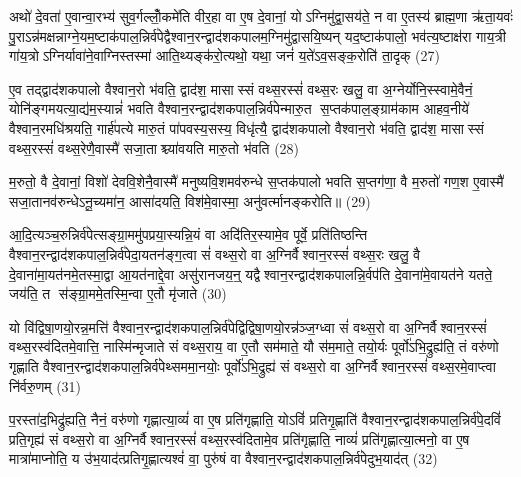 अथो॑ दे॒वता॑ ए॒वान्वा॒रभ्य॑ सुव॒र्गल्लोँ॒कमे॑ति वीर॒हा वा ए॒ष दे॒वानां॒ योऽग्निमु॑द्वा॒सय॑ते॒ न वा ए॒तस्य॑ ब्राह्म॒णा ऋ॑ता॒यवः॑ पु॒राऽन्न॑मक्षन्नाग्ने॒यम॒ष्टाक॑पाल॒न्निर्व॑पेद्वैश्वान॒रन्द्वाद॑शकपालम॒ग्निमु॑द्वासयि॒ष्यन् यद॒ष्टाक॑पालो॒ भव॑त्य॒ष्टाक्ष॑रा गाय॒त्री गा॑य॒त्रोऽग्निर्यावा॑ने॒वाग्निस्तस्मा॑ आति॒थ्यङ्क॑रो॒त्यथो॒ यथा॒ जनं॑ य॒ते॑ऽव॒सङ्क॒रोति॑ ता॒दृक् (27)

ए॒व तद्द्वाद॑शकपालो वैश्वान॒रो भ॑वति॒ द्वाद॑श॒ मासास्सं वथ्स॒रस्सं॑ वथ्स॒रः खलु॒ वा अ॒ग्नेर्योनि॒स्स्वामे॒वैनं॒ योनि॑ङ्गमयत्या॒द्य॑म॒स्यान्नं॑ भवति वैश्वान॒रन्द्वाद॑शकपाल॒न्निर्व॑पेन्मारु॒त स॒प्तक॑पाल॒ङ्ग्राम॑काम आहव॒नीये॑ वैश्वान॒रमधि॑श्रयति॒ गार्\mbox{}ह॑पत्ये मारु॒तं पा॑पवस्य॒सस्य॒ विधृ॑त्यै॒ द्वाद॑शकपालो वैश्वान॒रो भ॑वति॒ द्वाद॑श॒ मासास्सं वथ्स॒रस्सं॑ वथ्स॒रेणै॒वास्मै॑ सजा॒ताश्च्या॑वयति मारु॒तो भ॑वति (28)

म॒रुतो॒ वै दे॒वानां॒ विशो॑ देववि॒शेनै॒वास्मै॑ मनुष्यवि॒शमव॑रुन्धे स॒प्तक॑पालो भवति स॒प्तग॑णा॒ वै म॒रुतो॑ गण॒श ए॒वास्मै॑ सजा॒तानव॑रुन्धेऽनू॒च्यमा॑न॒ आसा॑दयति॒ विश॑मे॒वास्मा॒ अनु॑वर्त्मानङ्करोति॥ (29)

{\anuvakamend[{प्र॒जाका॑मस्सं वथ्स॒रः पु॒नात्ये॒वैनं॑ पू॒तस्सम॑ष्ट्यै ता॒दृङ्मा॑रु॒तो भ॑व॒त्येका॒न्नत्रि॒ꣳ॒शच्च॑॥५॥}]}

आ॒दि॒त्यञ्च॒रुन्निर्व॑पेत्सङ्ग्रा॒ममु॑पप्रया॒स्यन्नि॒यं वा अदि॑तिर॒स्यामे॒व पूर्वे॒ प्रति॑तिष्ठन्ति वैश्वान॒रन्द्वाद॑शकपाल॒न्निर्व॑पेदा॒यतन॑ङ्ग॒त्वा सं॑ वथ्स॒रो वा अ॒ग्निर्वैश्वान॒रस्सं॑ वथ्स॒रः खलु॒ वै दे॒वाना॑मा॒यत॑नमे॒तस्मा॒द्वा आ॒यत॑नाद्दे॒वा असु॑रानजय॒न्॒ यद्वैश्वान॒रन्द्वाद॑शकपालन्नि॒र्वप॑ति दे॒वाना॑मे॒वायत॑ने यतते॒ जय॑ति॒ त स॑ङ्ग्रा॒ममे॒तस्मि॒न्वा ए॒तौ मृ॑जाते (30)

यो वि॑द्विषा॒णयो॒रन्न॒मत्ति॑ वैश्वान॒रन्द्वाद॑शकपाल॒न्निर्व॑पेद्विद्विषा॒णयो॒रन्न॑ञ्ज॒ग्ध्वा सं॑ वथ्स॒रो वा अ॒ग्निर्वैश्वान॒रस्सं॑ वथ्स॒रस्व॑दितमे॒वात्ति॒ नास्मि॑न्मृजाते सं वथ्स॒राय॒ वा ए॒तौ सम॑माते॒ यौ स॑म॒माते॒ तयो॒र्यः पूर्वो॑ऽभि॒द्रुह्य॑ति॒ तं वरु॑णो गृह्णाति वैश्वान॒रन्द्वाद॑शकपाल॒न्निर्व॑पेथ्सममा॒नयोः॒ पूर्वो॑ऽभि॒द्रुह्य॑ सं वथ्स॒रो वा अ॒ग्निर्वैश्वान॒रस्सं॑ वथ्स॒रमे॒वाप्त्वा नि॑र्वरु॒णम् (31)

प॒रस्ता॑द॒भिद्रु॑ह्यति॒ नैनं॒ वरु॑णो गृह्णात्या॒व्यं॑ वा ए॒ष प्रति॑गृह्णाति॒ योऽविं॑ प्रतिगृ॒ह्णाति॑ वैश्वान॒रन्द्वाद॑शकपाल॒न्निर्व॑पे॒दविं॑ प्रति॒गृह्य॑ सं वथ्स॒रो वा अ॒ग्निर्वैश्वान॒रस्सं॑ वथ्स॒रस्व॑दितामे॒व प्रति॑गृह्णाति॒ नाव्यं॑ प्रति॑गृह्णात्या॒त्मनो॒ वा ए॒ष मात्रा॑माप्नोति॒ य उ॑भ॒याद॑त्प्रतिगृ॒ह्णात्यश्वं॑ वा॒ पुरु॑षं वा वैश्वान॒रन्द्वाद॑शकपाल॒न्निर्व॑पेदुभ॒याद॑त् (32)


